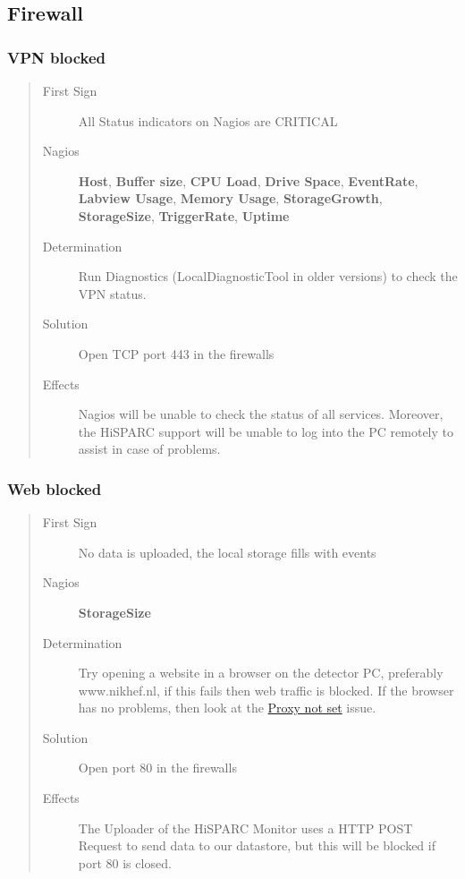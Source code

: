 \documentclass[a4paper,11pt,english]{sphinxmanual}
\begin{document}
\subsection{Firewall}
\label{known-issues:firewall}

\subsubsection{VPN blocked}
\label{known-issues:vpn-blocked}\begin{quote}\begin{description}
\item[{First Sign}] \leavevmode
All Status indicators on Nagios are CRITICAL

\item[{Nagios}] \leavevmode
\textbf{Host}, \textbf{Buffer size}, \textbf{CPU Load}, \textbf{Drive Space}, \textbf{EventRate}, \textbf{Labview Usage}, \textbf{Memory Usage}, \textbf{StorageGrowth}, \textbf{StorageSize}, \textbf{TriggerRate}, \textbf{Uptime}

\item[{Determination}] \leavevmode
Run Diagnostics (LocalDiagnosticTool in older versions) to check the VPN status.

\item[{Solution}] \leavevmode
Open TCP port 443 in the firewalls

\item[{Effects}] \leavevmode
Nagios will be unable to check the status of all services. Moreover, the HiSPARC support will be unable to log into the PC remotely to assist in case of problems.

\end{description}\end{quote}


\subsubsection{Web blocked}
\label{known-issues:web-blocked}\begin{quote}\begin{description}
\item[{First Sign}] \leavevmode
No data is uploaded, the local storage fills with events

\item[{Nagios}] \leavevmode
\textbf{StorageSize}

\item[{Determination}] \leavevmode
Try opening a website in a browser on the detector PC, preferably www.nikhef.nl, if this fails then web traffic is blocked. If the browser has no problems, then look at the {\hyperref[known-issues:proxy-not-set]{Proxy not set}} issue.

\item[{Solution}] \leavevmode
Open port 80 in the firewalls

\item[{Effects}] \leavevmode
The Uploader of the HiSPARC Monitor uses a HTTP POST Request to send data to our datastore, but this will be blocked if port 80 is closed.

\end{description}\end{quote}
\end{document}
